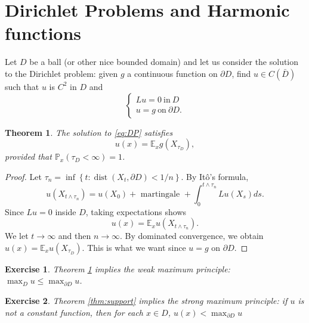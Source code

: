 \documentclass[twoside, 12pt]{book}
\numberwithin{equation}{chapter}
\newtheorem{theorem}{Theorem}[section]
\newtheorem{exercise}{Exercise}[section]
\def\mP{{\mathbb P}}
\def\leq{\leqslant}
\def\p{\partial}
\begin{document}
	\section{Dirichlet Problems and Harmonic functions}
	Let $D$ be a ball (or other nice bounded domain) and let us consider the solution to the Dirichlet problem: given $g$ a continuous function on $\p D$, find $u\in C(\bar D)$ such that $u$ is $C^2$ in $D$ and 
	\begin{equation}\label{eq:DP}
		\begin{cases}
			Lu=0~\mbox{in}~ D\\
			u=g ~\mbox{on}~\p D. 
		\end{cases}
	\end{equation}
	\begin{theorem}\label{thm:PR-DP}
		The solution to \eqref{eq:DP} satisfies
		$$
		u(x)=\mathbb{E}_x g\left(X_{\tau_D}\right), 
		$$
		provided that $\mP_x(\tau_D<\infty)=1$. 
	\end{theorem}
	\begin{proof}
		Let $\tau_n=\inf \left\{t: \operatorname{dist}\left(X_t, \partial D\right)<1 / n\right\}$. By Itô's formula,
		$$
		u\left(X_{t \wedge \tau_n}\right)=u\left(X_0\right)+\text { martingale }+\int_0^{t \wedge \tau_n} L u\left(X_s\right) d s .
		$$
		Since $L u=0$ inside $D$, taking expectations shows
		$$
		u(x)=\mathbb{E}_x u\left(X_{t \wedge \tau_n}\right) .
		$$
		We let $t \rightarrow \infty$ and then $n \rightarrow \infty$. By dominated convergence, we obtain $u(x)=\mathbb{E}_x u\left(X_{\tau_D}\right)$. This is what we want since $u=g$ on $\partial D$.
	\end{proof}
	\begin{exercise}
		Theorem \ref{thm:PR-DP} implies the weak maximum principle: $\max_{D} u\leq \max_{\p D} u$. 
	\end{exercise}
	
	\begin{exercise}
		Theorem \ref{thm:support} implies the strong maximum principle: if $u$ is not a constant function, then for each  $x\in D$, $u(x)<\max_{\p D} u$
	\end{exercise}
	
\end{document}
